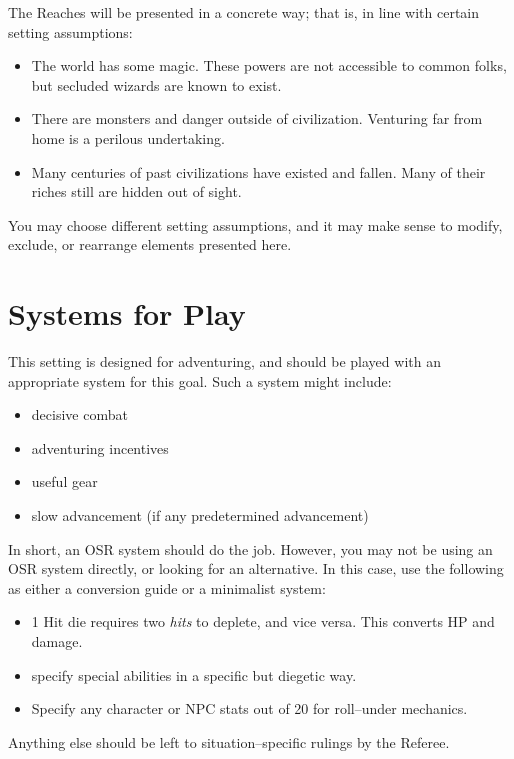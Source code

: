 \documentclass[notitlepage]{article}
\begin{document}
\begin{multicols}{2}
The Reaches will be presented in a concrete way; that is, in line with certain setting assumptions:

\begin{itemize}
\item The world has some magic. These powers are not accessible to common folks, but secluded wizards are known to exist.
\item There are monsters and danger outside of civilization. Venturing far from home is a perilous undertaking.
\item Many centuries of past civilizations have existed and fallen. Many of their riches still are hidden out of sight. 
\end{itemize}

You may choose different setting assumptions, and it may make sense to modify, exclude, or rearrange elements presented here.


\section{Systems for Play}

This setting is designed for adventuring, and should be played with an appropriate system for this goal.
Such a system might include:

\begin{itemize}
\item decisive combat
\item adventuring incentives
\item useful gear
\item slow advancement (if any predetermined advancement)
\end{itemize}

In short, an OSR system should do the job.
However, you may not be using an OSR system directly, or looking for an alternative.
In this case, use the following as either a conversion guide or a minimalist system:

\begin{itemize}
\item 1 Hit die requires two \emph{hits} to deplete, and vice versa. This converts HP and damage.
\item specify special abilities in a specific but diegetic way.
\item Specify any character or NPC stats out of 20 for roll--under mechanics.
\end{itemize}

Anything else should be left to situation--specific rulings by the Referee.


\end{multicols}
\end{document}
